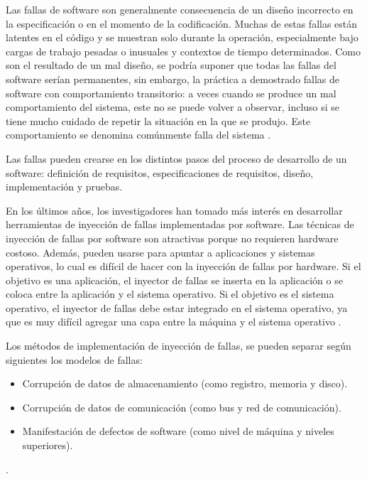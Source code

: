 \par Las fallas de software son generalmente consecuencia de un diseño incorrecto en la especificación o en el momento de la codificación. Muchas de estas fallas están latentes en el código y se muestran solo durante la operación, especialmente bajo cargas de trabajo pesadas o inusuales y contextos de tiempo determinados. Como son el resultado de un mal diseño, se podría suponer que todas las fallas del software serían permanentes, sin embargo, la práctica a demostrado fallas de software con comportamiento transitorio: a veces cuando se produce un mal comportamiento del sistema, este no se puede volver a observar, incluso si se tiene mucho cuidado de repetir la situación en la que se produjo. Este comportamiento se denomina comúnmente falla del sistema \cite{LIB05}.\\


\par Las fallas pueden crearse en los distintos pasos del proceso de desarrollo de un software: definición de requisitos, especificaciones de requisitos, diseño, implementación y pruebas.\\


\par En los últimos años, los investigadores han tomado más interés en desarrollar herramientas de inyección de fallas implementadas por software. Las técnicas de inyección de fallas por software son atractivas porque no requieren hardware costoso. Además, pueden usarse para apuntar a aplicaciones y sistemas operativos, lo cual es difícil de hacer con la inyección de fallas por hardware. Si el objetivo es una aplicación, el inyector de fallas se inserta en la aplicación o se coloca entre la aplicación y el sistema operativo. Si el objetivo es el sistema operativo, el inyector de fallas debe estar integrado en el sistema operativo, ya que es muy difícil agregar una capa entre la máquina y el sistema operativo \cite{LIB07}.\\

\par Los métodos de implementación de inyección de fallas, se pueden separar según siguientes los modelos de fallas:

\begin{itemize}
    \item Corrupción de datos de almacenamiento (como registro, memoria y disco).
    \item Corrupción de datos de comunicación (como bus y red de comunicación).
    \item Manifestación de defectos de software (como nivel de máquina y niveles superiores).
\end{itemize}.


